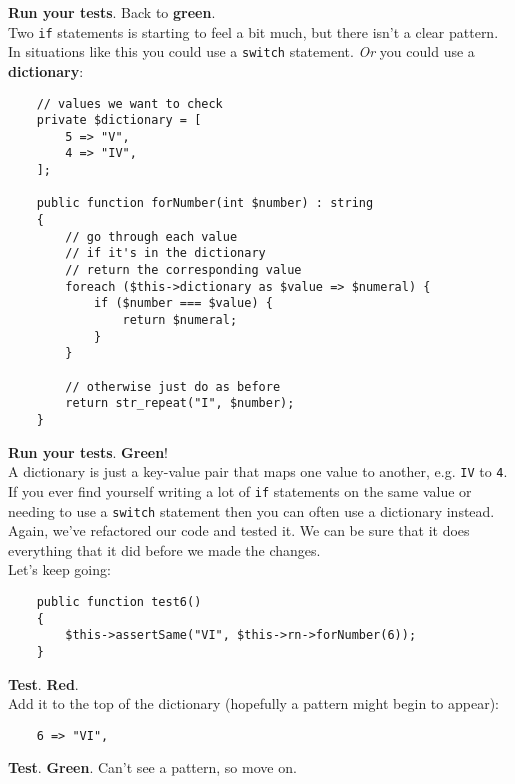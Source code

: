 \textbf{Run your tests}. Back to \textbf{green}.
\\

Two \texttt{if} statements is starting to feel a bit much, but there isn't a clear pattern. In situations like this you could use a \texttt{switch} statement. \textit{Or} you could use a \textbf{dictionary}:

\begin{verbatim}
    // values we want to check
    private $dictionary = [
        5 => "V",
        4 => "IV",
    ];

    public function forNumber(int $number) : string
    {
        // go through each value
        // if it's in the dictionary
        // return the corresponding value
        foreach ($this->dictionary as $value => $numeral) {
            if ($number === $value) {
                return $numeral;
            }
        }

        // otherwise just do as before
        return str_repeat("I", $number);
    }
\end{verbatim}

\textbf{Run your tests}. \textbf{Green}!
\\

A dictionary is just a key-value pair that maps one value to another, e.g. \texttt{IV} to \texttt{4}. If you ever find yourself writing a lot of \texttt{if} statements on the same value or needing to use a \texttt{switch} statement then you can often use a dictionary instead.
\\

Again, we've refactored our code and tested it. We can be sure that it does everything that it did before we made the changes.
\\

Let's keep going:

\begin{verbatim}
    public function test6()
    {
        $this->assertSame("VI", $this->rn->forNumber(6));
    }
\end{verbatim}

\textbf{Test}. \textbf{Red}.
\\

Add it to the top of the dictionary (hopefully a pattern might begin to appear):

\begin{verbatim}
    6 => "VI",
\end{verbatim}

\textbf{Test}. \textbf{Green}. Can't see a pattern, so move on.


